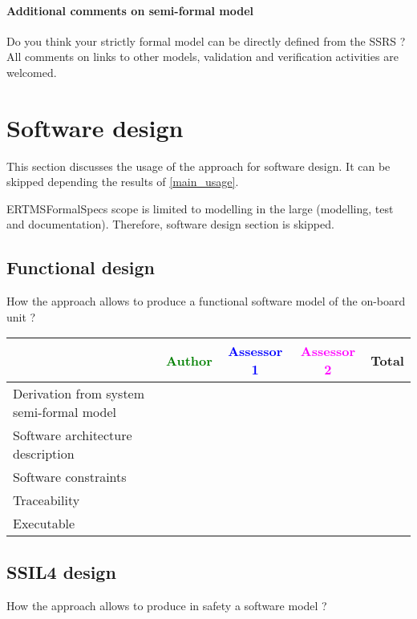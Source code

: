 \paragraph{Additional comments on semi-formal  model} Do you think your strictly formal  model can be directly defined from the SSRS ?
All comments on links to  other models, validation and verification activities are welcomed.


\section{Software design}
This section discusses the usage of the approach for software design.
It can be skipped depending the results of \ref{main_usage}.

\begin{author_comment}
ERTMSFormalSpecs scope is limited to modelling in the large (modelling, test and documentation). Therefore, software design section is skipped.  
\end{author_comment}

\subsection{Functional design}

How the approach allows to  produce a functional software model of the on-board unit ?

\begin{tabular}{|l | c | c | c | c|}
\hline
& \textcolor{green}{Author} & \textcolor{blue}{Assessor 1} & \textcolor{magenta}{Assessor 2} & Total \\
\hline
Derivation from system semi-formal model  & & & &  \\
\hline 
Software architecture description  & & & &  \\
\hline
Software constraints  & & & &  \\
\hline
Traceability  & & & &  \\
\hline
Executable  & & & &  \\
\hline
\end{tabular}

\subsection{SSIL4 design}

How the approach allows to  produce in safety a software model ?

